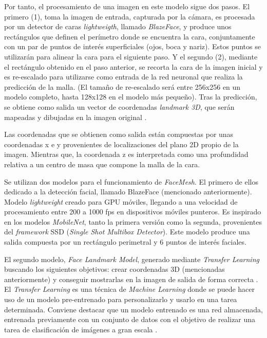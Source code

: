 Por tanto, el procesamiento de una imagen en este modelo sigue dos pasos. El primero (1), toma la imagen de entrada, capturada por la cámara, es procesada por un detector de caras \textit{lightweigth}, llamado \textit{BlazeFace}, y produce unos rectángulos que definen el perímetro donde se encuentra la cara, conjuntamente con un par de puntos de interés superficiales (ojos, boca y nariz). Estos puntos se utilizarán para alinear la cara para el siguiente paso. Y el segundo (2), mediante el rectángulo obtenido en el paso anterior, se recorta la cara de la imagen inicial y es re-escalado para utilizarse como entrada de la red neuronal que realiza la predicción de la malla. (El tamaño de re-escalado será entre 256x256 en un modelo completo, hasta 128x128 en el modelo más pequeño). Tras la predicción, se obtiene como salida un vector de coordenadas \textit{landmark 3D}, que serán mapeadas y dibujadas en la imagen original \cite{faceMesh2}. 

Las coordenadas que se obtienen como salida están compuestas por unas coordenadas x e y provenientes de localizaciones del plano 2D propio de la imagen. Mientras que, la coordenada z es interpretada como una profundidad relativa a un centro de masa que compone la malla de la cara.

Se utilizan dos modelos para el funcionamiento de \textit{FaceMesh}. El primero de ellos dedicado a la detección facial, llamado BlazeFace (mencionado anteriormente). Modelo \textit{lightweight} creado para GPU móviles, llegando a una velocidad de procesamiento entre 200 a 1000 fps en dispositivos móviles punteros. Es inspirado en los modelos \textit{MobileNet}, tanto la primera versión como la segunda, provenientes del \textit{framework} SSD (\textit{Single Shot Multibox Detector}). Este modelo produce una salida compuesta por un rectángulo perimetral y 6 puntos de interés faciales. \cite{blazeface}

El segundo modelo, \textit{Face Landmark Model}, generado mediante \textit{Transfer Learning} buscando los siguientes objetivos: crear coordenadas 3D (mencionadas anteriormente) y conseguir mostrarlas en la imagen de salida de forma correcta \cite{faceMesh}. El \textit{Transfer Learning} es una técnica de \textit{Machine Learning} donde se puede hacer uso de un modelo pre-entrenado para personalizarlo y usarlo en una tarea determinada. Conviene destacar que un modelo entrenado es una red almacenada, entrenada previamente con un conjunto de datos con el objetivo de realizar una tarea de clasificación de imágenes a gran escala \cite{transferLearning}.

